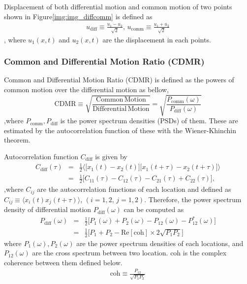 \documentclass[a4paper,12pt]{book}
\begin{document}
Displacement of both differential motion and common motion of two points shown in Figure\ref{img:img_diffcomm} is defined as
\begin{eqnarray}\label{eq:eq22}
  u_{\mathrm{diff}} \equiv \frac{u_{1}-u_{2}}{\sqrt{2}}, \,
  u_{\mathrm{comm}}  \equiv \frac{u_{1}+u_{2}}{\sqrt{2}}
\end{eqnarray}
, where $u_{1}(x,t)$ and $u_2(x,t)$ are the displacement in each points.



\subsubsection{Common and Differential Motion Ratio (CDMR)}
Common and Differential Motion Ratio (CDMR) is defined as the powers of common motion over the differential motion as bellow,
\begin{equation}
  \mathrm{CDMR} \equiv \sqrt{\frac{\mathrm{Common\,Motion}}{\mathrm{Differential\,Motion}}} = \sqrt{\frac{P_{\mathrm{comm}}(\omega)}{P_{\mathrm{diff}}(\omega)}} \label{eq:eq23}
\end{equation}
,where $P_{\mathrm{comm}},P_{\mathrm{diff}}$ is the power spectrum densities (PSDs) of them. These are estimated by the autocorrelation function of these with the Wiener-Khinchin theorem.

Autocorrelation function $C_{\mathrm{diff}}$ is given by
\begin{eqnarray}
  C_{\mathrm{diff}}(\tau) &=& \frac{1}{2}
  \biggl\langle
  \biggl[ x_{1}(t)-x_{2}(t) \biggr] \biggl[ x_{1}(t+\tau)-x_{2}(t+\tau) \biggr]
  \biggr\rangle \\
  &=& \frac{1}{2}\biggl[ C_{11}(\tau) - C_{12}(\tau) - C_{21}(\tau) + C_{22}(\tau) \biggr], 
\end{eqnarray}
,where $C_{ij}$ are the autocorrelation functions of each location and defined as $ C_{ij} \equiv \langle x_{i}(t)x_{j}(t+\tau)\rangle,\, (i=1,2,\,j=1,2)$. Therefore, the power spectrum density of differential motion $P_{\mathrm{diff}}(\omega)$ can be computed as
\begin{eqnarray}
  P_{\mathrm{diff}}(\omega) &=& \frac{1}{2}\biggl[ P_{1}(\omega) + P_{2}(\omega) - P_{12}(\omega) - P_{12}^*(\omega) \biggr]\\
  &=& \frac{1}{2} \biggl[ P_{1}+P_{2} - \mathrm{Re}\left[\mathrm{coh} \right]\times2\sqrt{P_{1}P_{2}} \biggr] \label{eq:eq31}
\end{eqnarray}
where $P_{1}(\omega),P_{2}(\omega)$ are the power spectrum densities of each locations, and $P_{12}(\omega)$ are the cross spectrum between two location. $\mathrm{coh}$ is the complex coherence between them defined below.
\begin{eqnarray}
  \mathrm{coh} \equiv \frac{P_{12}}{\sqrt{P_{1}P_{2}}}
\end{eqnarray}
\end{document}
